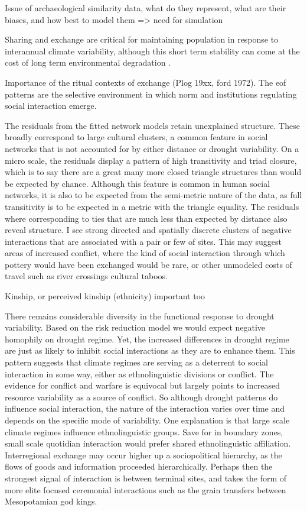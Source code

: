 \documentclass[10pt]{iopart}
\begin{document}
Issue of archaeological similarity data, what do they represent, what are their biases, and how best to model them => need for simulation \parencite{cremaetal2014}

 Sharing and exchange are critical for maintaining population in response to interannual climate variability, although this short term stability can come at the cost of long term environmental degradation \parencite{Janssen2010}.

Importance of the ritual contexts of exchange (Plog 19xx, ford 1972). The eof patterns are the selective environment in which norm and institutions regulating social interaction emerge. 



The residuals from the fitted network models retain unexplained structure. These broadly correspond to large cultural clusters, a common feature in social networks that is not accounted for by either distance or drought variability. On a micro scale, the residuals display a pattern of high transitivity and triad closure, which is to say there are a great many more closed triangle structures than would be expected by chance. Although this feature is common in human social networks, it is also to be expected from the semi-metric nature of the data, as full transitivity is to be expected in a metric with the triangle equality. The residuals where corresponding to ties that are much less than expected by distance also reveal structure. I see strong directed and spatially discrete clusters of negative interactions that are associated with a pair or few of sites. This may suggest areas of increased conflict, where the kind of social interaction through which pottery would have been exchanged would be rare, or other unmodeled costs of travel such as river crossings cultural taboos. 

Kinship, or perceived kinship (ethnicity) important too \parencite{nolin2010}

There remains considerable diversity in the functional response to drought variability. Based on the risk reduction model we would expect negative homophily on drought regime. Yet, the increased differences in drought regime are just as likely to inhibit social interactions as they are to enhance them. This pattern suggests that climate regimes are serving as a deterrent to social interaction in some way, either as ethnolinguistic divisions or conflict. The evidence for conflict and warfare is equivocal \parencite{Kohler2014TheSouthwest, leblanc} but largely points to increased resource variability as a source of conflict. So although drought patterns do influence social interaction, the nature of the interaction varies over time and depends on the specific mode of variability. One explanation is that large scale climate regimes influence ethnolinguistic groups. Save for in boundary zones, small scale quotidian interaction would prefer shared ethnolinguistic affiliation. Interregional exchange may occur higher up a sociopolitical hierarchy, as the flows of goods and information proceeded hierarchically. Perhaps then the strongest signal of interaction is between terminal sites, and takes the form of more elite focused ceremonial interactions such as the grain transfers between Mesopotamian god kings.
\end{document}
